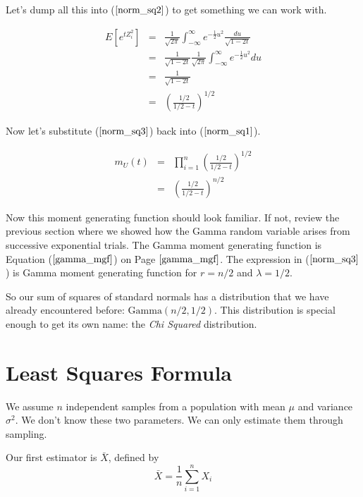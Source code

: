 \documentclass[]{article}
\begin{document}
Let's dump all this into ($\ref{norm_sq2}$) to get something
we can work with.

\begin{eqnarray}
E \left[ e^{t Z_i^2} \right] &= & \frac{1}{\sqrt{2\pi}}
     \int_{-\infty}^{\infty} e^{-\frac{1}{2} u^2}
      \frac{du}{\sqrt{1-2t}} \nonumber \\
  &= & \frac{1}{\sqrt{1-2t}} \frac{1}{\sqrt{2\pi}}
     \int_{-\infty}^{\infty} e^{-\frac{1}{2} u^2} du \nonumber \\
  &= & \frac{1}{\sqrt{1-2t}}  \nonumber  \\
  &= & \left( \frac{1/2}{1/2 - t} \right)^{1/2} \label{norm_sq3}
\end{eqnarray}

Now let's substitute ($\ref{norm_sq3}$) back into
($\ref{norm_sq1}$).

\begin{eqnarray}
m_U(t) &= &\prod_{i=1}^n \left( \frac{1/2}{1/2 - t} \right)^{1/2}
   \nonumber \\
   &= & \left( \frac{1/2}{1/2 - t} \right)^{n/2}
\end{eqnarray}

Now this moment generating function should look familiar.
If not, review the previous section where we showed how the
Gamma random variable arises from successive exponential trials.
The Gamma moment generating function is 
Equation ($\ref{gamma_mgf}$) on Page $\pageref{gamma_mgf}$.
The expression in ($\ref{norm_sq3}$) is Gamma moment generating
function for $r = n/2$ and $\lambda = 1/2$.

So our sum of squares of standard normals has a distribution
that we have already encountered before: $\mbox{Gamma}(n/2, 1/2)$.
This distribution is special enough to get its own name:
the \emph{Chi Squared} distribution.


\appendix

\section{Least Squares Formula}

We assume $n$ independent samples from a population with
mean $\mu$ and variance $\sigma^2$.  We don't know these
two parameters.  We can only estimate them through sampling.

Our first estimator is $\bar{X}$, defined by
\begin{equation}
\bar{X} = \frac{1}{n} \sum_{i=1}^n X_i
\end{equation}
\end{document}
